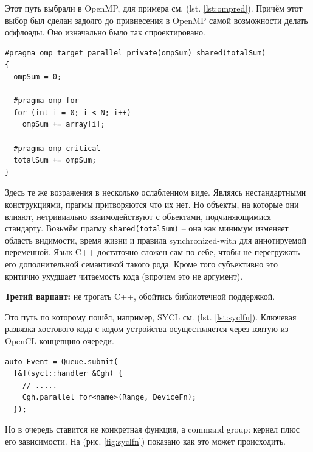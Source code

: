 \documentclass[a4paper,12pt,oneside]{article}
\begin{document}
Этот путь выбрали в OpenMP, для примера см. (lst. \ref{lst:ompred}).
Причём этот выбор был сделан задолго до привнесения в OpenMP самой возможности делать оффлоады.
Оно изначально было так спроектировано.

\begin{lstlisting}[caption={Редукция, OpenMP},label={lst:ompred}]
#pragma omp target parallel private(ompSum) shared(totalSum)
{
  ompSum = 0;

  #pragma omp for
  for (int i = 0; i < N; i++)
    ompSum += array[i];

  #pragma omp critical
  totalSum += ompSum;
}
\end{lstlisting}

Здесь те же возражения в несколько ослабленном виде.
Являясь нестандартными конструкциями, прагмы притворяются что их нет.
Но объекты, на которые они влияют, нетривиально взаимодействуют с объектами, подчиняющимися стандарту.
Возьмём прагму \lstinline!shared(totalSum)! -- она как минимум изменяет область видимости, время жизни и правила synchronized-with для аннотируемой переменной.
Язык C++ достаточно сложен сам по себе, чтобы не перегружать его дополнительной семантикой такого рода.
Кроме того субъективно это критично ухудшает читаемость кода (впрочем это не аргумент).

\textbf{Третий вариант:} не трогать C++, обойтись библиотечной поддержкой.

Это путь по которому пошёл, например, SYCL см. (lst. \ref{lst:syclfn}).
Ключевая развязка хостового кода с кодом устройства осуществляется через взятую из OpenCL концепцию очереди.

\begin{lstlisting}[caption={Выполнение DeviceFn, SYCL},label={lst:syclfn}]
auto Event = Queue.submit(
  [&](sycl::handler &Cgh) {
    // .....
    Cgh.parallel_for<name>(Range, DeviceFn);
  });
\end{lstlisting}

Но в очередь ставится не конкретная функция, а command group: кернел плюс его зависимости. На (рис. \ref{fig:syclfn}) показано как это может происходить.
\end{document}
